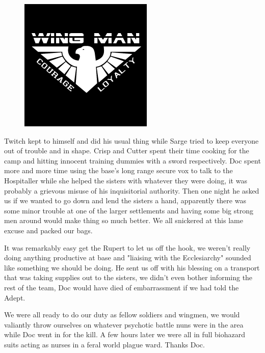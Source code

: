 \begin{figure}
	\begin{center}
		\includegraphics[width=\figwidth]{pics/6/20.png}
	\end{center}
\end{figure}
Twitch kept to himself and did his usual thing while Sarge tried to keep everyone out of trouble and in shape. 
Crisp and Cutter spent their time cooking for the camp and hitting innocent training dummies with a sword respectively. 
Doc spent more and more time using the base's long range secure vox to talk to the Hospitaller while she helped the sisters with whatever they were doing, it was probably a grievous misuse of his inquisitorial authority. 
Then one night he asked us if we wanted to go down and lend the sisters a hand, apparently there was some minor trouble at one of the larger settlements and having some big strong men around would make thing so much better. 
We all snickered at this lame excuse and packed our bags.

It was remarkably easy get the Rupert to let us off the hook, we weren't really doing anything productive at base and "liaising with the Ecclesiarchy" sounded like something we should be doing. 
He sent us off with his blessing on a transport that was taking supplies out to the sisters, we didn't even bother informing the rest of the team, Doc would have died of embarrassment if we had told the Adept. 

We were all ready to do our duty as fellow soldiers and wingmen, we would valiantly throw ourselves on whatever psychotic battle nuns were in the area while Doc went in for the kill. 
A few hours later we were all in full biohazard suits acting as nurses in a feral world plague ward. 
Thanks Doc.

